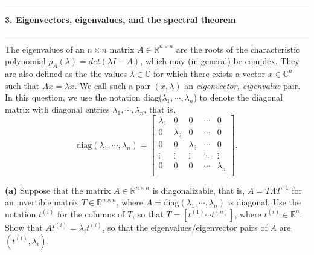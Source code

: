 \documentclass[11pt]{article}
\newcommand\question[2]{\vspace{.25in}\hrule\textbf{#1. #2}\vspace{.5em}\hrule\vspace{.10in}}
\renewcommand\part[1]{\vspace{.10in}\textbf{(#1)  }}
\begin{document}
\question{3}{Eigenvectors, eigenvalues, and the spectral theorem}
The eigenvalues of an $n\times n$ matrix $A \in \mathbb{R}^{n\times n}$ are the roots of the characteristic polynomial $p_A(\lambda) = det(\lambda I-A)$, which may (in general) be complex. They are also defined as the the values $\lambda \in \mathbb{C}$ for which there exists a vector $x \in \mathbb{C}^n$ such that $Ax = \lambda x$. We call such a pair $(x, \lambda)$ an \emph{eigenvector, eigenvalue} pair. In this question, we use the notation diag($\lambda_1, \cdots, \lambda_n$) to denote the diagonal matrix with diagonal entries $\lambda_1, \cdots, \lambda_n$, that is,
$$\text{diag}(\lambda_1, \cdots, \lambda_n) = \left[
                                                \begin{array}{ccccc}
                                                  \lambda_1 & 0 & 0 & \cdots & 0 \\
                                                  0 & \lambda_2 & 0 & \cdots & 0 \\
                                                  0 & 0 & \lambda_3 & \cdots & 0 \\
                                                  \vdots & \vdots & \vdots & \ddots & \vdots \\
                                                  0 & 0 & 0 & \cdots & \lambda_n \\
                                                \end{array}
                                              \right].$$

\part{a}Suppose that the matrix $A \in \mathbb{R}^{n\times n}$ is diagonalizable, that is, $A = T\Lambda T^{-1}$ for an invertible matrix $T \in \mathbb{R}^{n\times n}$, where $A = \text{diag}(\lambda_1, \cdots, \lambda_n)$ is diagonal. Use the notation $t^{(i)}$ for the columns of $T$, so that $T = [t^{(1)} \cdots t^{(n)}]$, where $t^{(i)}\in \mathbb{R}^n$. Show that $At^{(i)} = \lambda_it^{(i)}$, so that the eigenvalues/eigenvector pairs of $A$ are $(t^{(i)}, \lambda_i)$.
\end{document}
